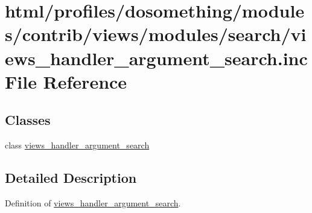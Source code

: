 \hypertarget{views__handler__argument__search_8inc}{
\section{html/profiles/dosomething/modules/contrib/views/modules/search/views\_\-handler\_\-argument\_\-search.inc File Reference}
\label{views__handler__argument__search_8inc}
}
\subsection*{Classes}
\begin{DoxyCompactItemize}
\item 
class \hyperlink{classviews__handler__argument__search}{views\_\-handler\_\-argument\_\-search}
\end{DoxyCompactItemize}


\subsection{Detailed Description}
Definition of \hyperlink{classviews__handler__argument__search}{views\_\-handler\_\-argument\_\-search}. 